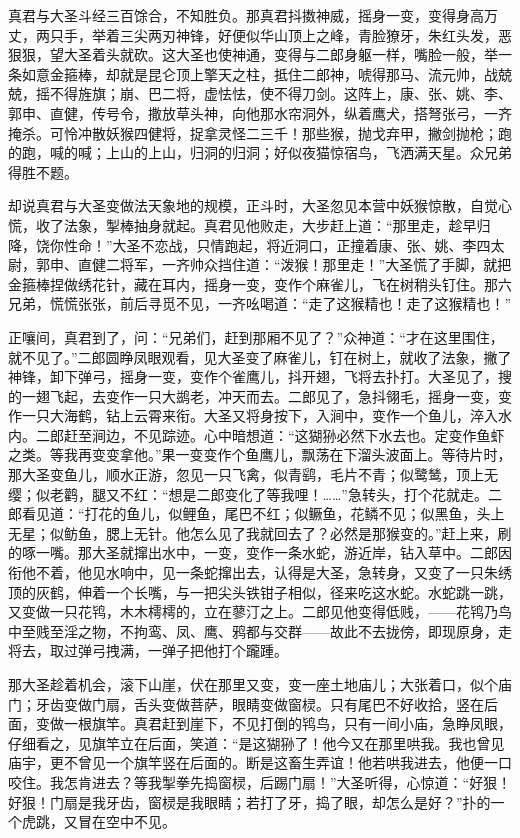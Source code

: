 \documentclass[12pt]{lsbook}
\begin{document}
真君与大圣斗经三百馀合，不知胜负。那真君抖擞神威，摇身一变，变得身高万丈，两只手，举着三尖两刃神锋，好便似华山顶上之峰，青脸獠牙，朱红头发，恶狠狠，望大圣着头就砍。这大圣也使神通，变得与二郎身躯一样，嘴脸一般，举一条如意金箍棒，却就是昆仑顶上擎天之柱，抵住二郎神，唬得那马、流元帅，战兢兢，摇不得旌旗；崩、巴二将，虚怯怯，使不得刀剑。这阵上，康、张、姚、李、郭申、直健，传号令，撒放草头神，向他那水帘洞外，纵着鹰犬，搭弩张弓，一齐掩杀。可怜冲散妖猴四健将，捉拿灵怪二三千！那些猴，抛戈弃甲，撇剑抛枪；跑的跑，喊的喊；上山的上山，归洞的归洞；好似夜猫惊宿鸟，飞洒满天星。众兄弟得胜不题。

却说真君与大圣变做法天象地的规模，正斗时，大圣忽见本营中妖猴惊散，自觉心慌，收了法象，掣棒抽身就起。真君见他败走，大步赶上道：“那里走，趁早归降，饶你性命！”大圣不恋战，只情跑起，将近洞口，正撞着康、张、姚、李四太尉，郭申、直健二将军，一齐帅众挡住道：“泼猴！那里走！”大圣慌了手脚，就把金箍棒捏做绣花针，藏在耳内，摇身一变，变作个麻雀儿，飞在树稍头钉住。那六兄弟，慌慌张张，前后寻觅不见，一齐吆喝道：“走了这猴精也！走了这猴精也！”

正嚷间，真君到了，问：“兄弟们，赶到那厢不见了？”众神道：“才在这里围住，就不见了。”二郎圆睁凤眼观看，见大圣变了麻雀儿，钉在树上，就收了法象，撇了神锋，卸下弹弓，摇身一变，变作个雀鹰儿，抖开翅，飞将去扑打。大圣见了，搜的一翅飞起，去变作一只大鹚老，冲天而去。二郎见了，急抖翎毛，摇身一变，变作一只大海鹤，钻上云霄来衔。大圣又将身按下，入涧中，变作一个鱼儿，淬入水内。二郎赶至涧边，不见踪迹。心中暗想道：“这猢狲必然下水去也。定变作鱼虾之类。等我再变变拿他。”果一变变作个鱼鹰儿，飘荡在下溜头波面上。等待片时，那大圣变鱼儿，顺水正游，忽见一只飞禽，似青鹞，毛片不青；似鹭鸶，顶上无缨；似老鹳，腿又不红：“想是二郎变化了等我哩！……”急转头，打个花就走。二郎看见道：“打花的鱼儿，似鲤鱼，尾巴不红；似鳜鱼，花鳞不见；似黑鱼，头上无星；似鲂鱼，腮上无针。他怎么见了我就回去了？必然是那猴变的。”赶上来，刷的啄一嘴。那大圣就撺出水中，一变，变作一条水蛇，游近岸，钻入草中。二郎因衔他不着，他见水响中，见一条蛇撺出去，认得是大圣，急转身，又变了一只朱绣顶的灰鹤，伸着一个长嘴，与一把尖头铁钳子相似，径来吃这水蛇。水蛇跳一跳，又变做一只花鸨，木木樗樗的，立在蓼汀之上。二郎见他变得低贱，——花鸨乃鸟中至贱至淫之物，不拘鸾、凤、鹰、鸦都与交群——故此不去拢傍，即现原身，走将去，取过弹弓拽满，一弹子把他打个躘踵。

那大圣趁着机会，滚下山崖，伏在那里又变，变一座土地庙儿；大张着口，似个庙门；牙齿变做门扇，舌头变做菩萨，眼睛变做窗棂。只有尾巴不好收拾，竖在后面，变做一根旗竿。真君赶到崖下，不见打倒的鸨鸟，只有一间小庙，急睁凤眼，仔细看之，见旗竿立在后面，笑道：“是这猢狲了！他今又在那里哄我。我也曾见庙宇，更不曾见一个旗竿竖在后面的。断是这畜生弄谊！他若哄我进去，他便一口咬住。我怎肯进去？等我掣拳先捣窗棂，后踢门扇！”大圣听得，心惊道：“好狠！好狠！门扇是我牙齿，窗棂是我眼睛；若打了牙，捣了眼，却怎么是好？”扑的一个虎跳，又冒在空中不见。
\end{document}

